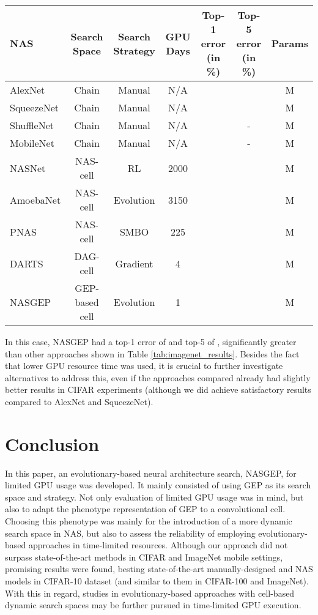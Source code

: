 \documentclass[conference]{IEEEtran}
\begin{document}
	\begin{table*}[htb]
		\centering
		\caption{Results from ImageNet dataset in mobile setting.}
		\label{tab:imagenet_results}{\begin{tabular}{@{}lcccccc@{}}
				\toprule
				\textbf{NAS} & \textbf{Search Space} & \textbf{Search Strategy} & \textbf{GPU Days} & \textbf{Top-1 error (in \%)} & \textbf{Top-5 error (in \%)} & \textbf{Params} \\ \midrule
				AlexNet \cite{krizhevsky2012imagenet} & Chain & Manual & N/A &  &  & M \\
				SqueezeNet \cite{iandola2016squeezenet} & Chain & Manual & N/A &  &  & M \\
				ShuffleNet \cite{zhang2018shufflenet} & Chain & Manual & N/A &  & - & M \\
				MobileNet \cite{howard2017mobilenets} & Chain & Manual & N/A &  & - & M \\ \midrule
				NASNet \cite{zoph2017learning} & NAS-cell & RL & 2000 &  &  & M \\
				AmoebaNet \cite{real2018regularized} & NAS-cell & Evolution & 3150 &  &  & M \\
				PNAS \cite{liu2017progressive} & NAS-cell & SMBO & 225 &  &  & M  \\                
				DARTS \cite{liu2018darts} & DAG-cell & Gradient & 4 &  &  & M \\ \midrule
				NASGEP & GEP-based cell & Evolution & 1 &  &  & M \\ \bottomrule
			\end{tabular}}
	\end{table*}
	
	In this case, NASGEP had a top-1 error of  and top-5 of , significantly greater than other approaches shown in Table \ref{tab:imagenet_results}. 
	Besides the fact that lower GPU resource time was used, it is crucial to further investigate alternatives to address this, even if the approaches compared already had slightly better results in CIFAR experiments (although we did achieve satisfactory results compared to AlexNet and SqueezeNet).
	
	\section{Conclusion}
	
	In this paper, an evolutionary-based neural architecture search, NASGEP, for limited GPU usage was developed.
	It mainly consisted of using GEP as its search space and strategy.
	Not only evaluation of limited GPU usage was in mind, but also to adapt the phenotype representation of GEP to a convolutional cell.
	Choosing this phenotype was mainly for the introduction of a more dynamic search space in NAS, but also to assess the reliability of employing evolutionary-based approaches in time-limited resources.
	Although our approach did not surpass state-of-the-art methods in CIFAR and ImageNet mobile settings, promising results were found, besting state-of-the-art manually-designed and NAS models in CIFAR-10 dataset (and similar to them in CIFAR-100 and ImageNet). 
	With this in regard, studies in evolutionary-based approaches with cell-based dynamic search spaces may be further pursued in time-limited GPU execution.
	
\end{document}
